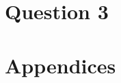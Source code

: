 \documentclass[11pt]{article}
\begin{document}
  \section{Question 3}

  \newpage
  \printbibliography
  \newpage

  \appendix
  \section*{Appendices}
  \renewcommand{\thesubsection}{\Alph{subsection}}

\end{document}
